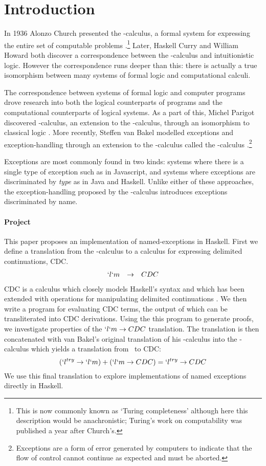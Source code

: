 \chapter{Introduction}

In 1936 Alonzo Church presented the \lam-calculus, a formal system for expressing the entire set of computable problems \cite{Church36}.\footnote{
  This is now commonly known as `Turing completeness' although here
  this description would be anachronistic; Turing's work on computability was published a year after Church's.
}
Later, Haskell Curry and William Howard both discover a correspondence between the \lam-calculus and intuitionistic logic. 
However the correspondence runs deeper than this: there is actually a true isomorphism between many systems of formal logic and computational calculi. 

The correspondence between systems of formal logic and computer programs drove research into both the logical counterparts of programs and the computational counterparts of logical systems.
As a part of this, Michel Parigot discovered \lmu-calculus, an extension to the \lam-calculus, 
through an isomorphism to classical logic \cite{Parigot92}.
More recently, Steffen van Bakel modelled exceptions and exception-handling through an extension to the \lam-calculus called the \ltry-calculus \cite{Bakel15}.\footnote{
  Exceptions are a form of error generated by computers to indicate that the flow of control cannot continue as expected and must be aborted. 
}

Exceptions are most commonly found in two kinds: 
  systems where there is a single type of exception such as in Javascript, 
  and systems where exceptions are discriminated by \emph{type} as in Java and Haskell. 
Unlike either of these approaches, 
the exception-handling proposed by the \ltry-calculus introduces exceptions discriminated by name.

\subsubsection{Project}
This paper proposes an implementation of named-exceptions in Haskell.
First we define a translation from the \lmu-calculus to a calculus for expressing delimited continuations, CDC.
\[
\begin{array}{lcr}
  `l`m & \to & CDC
\end{array}
\]
CDC is a calculus which closely models Haskell's syntax and which has been extended with operations for manipulating delimited continuations \cite{JonesDS07}. 
We then write a program for evaluating CDC terms, the output of which can be transliterated into CDC derivations.
Using the this program to generate proofs, we investigate properties of the $`l`m \to CDC$ translation.
The translation is then concatenated with van Bakel's original translation of his \ltry-calculus into the \lmu-calculus which yields a translation from \ltry\ to CDC:
\[
   (`l^{try} \to `l`m) + (`l`m \to CDC) = `l^{try} \to CDC
\]
We use this final translation to explore implementations of named exceptions directly in Haskell.

